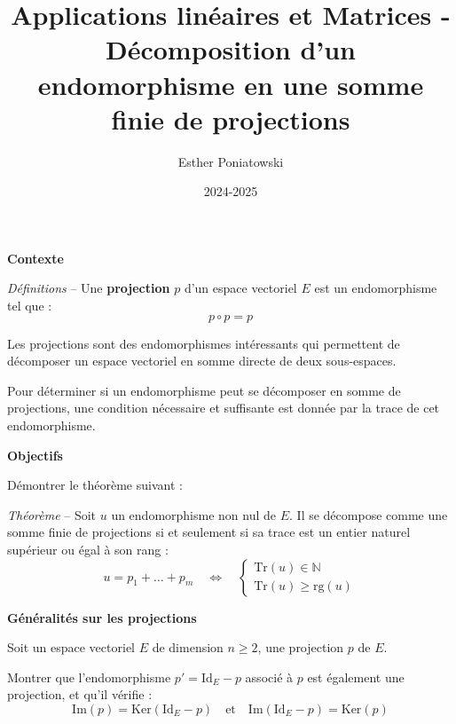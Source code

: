 \documentclass[10pt,a4paper]{article}
\title{Applications linéaires et Matrices - Décomposition d'un endomorphisme en une somme finie de projections}
\author{Esther Poniatowski}
\date{2024-2025}
\begin{document}
\textbf{Contexte}

\textit{Définitions} -- Une \textbf{projection} $p$ d'un espace vectoriel $E$ est un endomorphisme
tel que :
\[
p \circ p = p
\]

\bigskip

Les projections sont des endomorphismes intéressants qui permettent de décomposer un espace
vectoriel en somme directe de deux sous-espaces.

Pour déterminer si un endomorphisme peut se décomposer en somme de projections, une condition
nécessaire et suffisante est donnée par la trace de cet endomorphisme.

\bigskip

\textbf{Objectifs}

Démontrer le théorème suivant :

\textit{Théorème} -- Soit $u$ un endomorphisme non nul de $E$. Il se décompose comme une somme finie
de projections si et seulement si sa trace est un entier naturel supérieur ou égal à son rang :
\[
u = p_1 + \dots + p_m \quad \iff \quad
\begin{cases}
\mathrm{Tr}(u) \in \mathbb{N}\\
\mathrm{Tr}(u) \geq \mathrm{rg}(u)
\end{cases}
\]

\bigskip
\textbf{Généralités sur les projections}

Soit un espace vectoriel $E$ de dimension $n \geq 2$, une projection $p$ de $E$.

\q Montrer que l'endomorphisme \(
p' = \mathrm{Id}_E - p
\)
associé à $p$ est également une projection, et qu'il vérifie :
\[
\mathrm{Im}(p) = \mathrm{Ker}(\mathrm{Id}_E - p) \quad \text{et} \quad \mathrm{Im}(\mathrm{Id}_E - p) = \mathrm{Ker}(p)
\]
\end{document}
